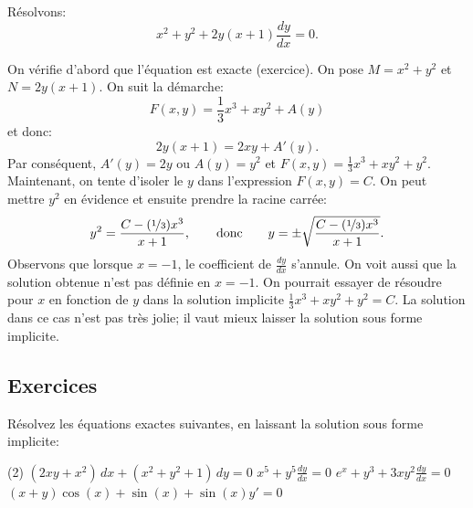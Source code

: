 \begin{example} \label{exact:exampleabove}
	Résolvons:
	\begin{equation*}
		x^2+y^2 + 2y(x+1) \frac{dy}{dx} = 0 .
	\end{equation*}

	On vérifie d'abord que l'équation est exacte (exercice).
	On pose $M= x^2+y^2$ et $N=2y(x+1)$.
	On suit la démarche:
	\begin{equation*}
		F(x,y) = \frac{1}{3}x^3 + xy^2 + A(y)
	\end{equation*}
	et  donc:
	\begin{equation*}
		2y(x+1) = 2xy + A'(y) .
	\end{equation*}
	Par conséquent, $A'(y) = 2y$ ou $A(y) = y^2$ et $F(x,y) = \frac{1}{3}x^3 + xy^2 + y^2$.
	Maintenant, on tente d'isoler le $y$ dans l'expression $F(x,y) = C$.  On peut mettre $y^2$ en évidence et ensuite prendre la racine carrée:
	\begin{equation*}
		y^2 = \frac{C-(\nicefrac{1}{3})x^3}{x+1},\qquad \text{donc} \qquad 	y = \pm \sqrt{\frac{C-(\nicefrac{1}{3})x^3}{x+1}}.
	\end{equation*}
	Observons que lorsque $x=-1$, le coefficient de $\frac{dy}{dx}$ s'annule.
	On voit aussi que la solution obtenue n'est pas définie en $x=-1$.
	On pourrait essayer de résoudre pour $x$ en fonction de $y$ dans la solution implicite $\frac{1}{3}x^3 + xy^2 + y^2 = C$.
	La solution dans ce cas n'est pas très jolie; il vaut mieux laisser la solution sous forme implicite.
\end{example}



\subsection{Exercices}

\begin{exercise}
	Résolvez les équations exactes suivantes, en laissant la solution sous forme implicite:
	\begin{tasks}(2)
		\task $(2 xy + x^2) \, dx + (x^2+y^2+1) \, dy = 0$
		\task $x^5 + y^5 \frac{dy}{dx} = 0$
		\task $e^x+y^3 + 3xy^2 \frac{dy}{dx} = 0$
		\task $(x+y)\cos(x)+\sin(x) + \sin(x)y' = 0$
	\end{tasks}
\end{exercise}



